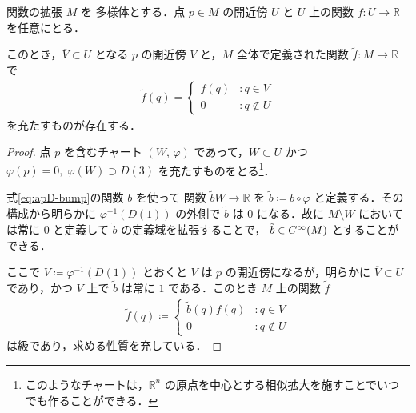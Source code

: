 \documentclass[geometry_main]{subfiles}
\begin{document}
\begin{mylem}[label=gen_cinfty]{\cinfty 関数の拡張}
	$M$ を \cinfty 多様体とする．点 $p \in M$ の開近傍 $U$ と $U$ 上の\cinfty 関数 $f \colon U \to \mathbb{R}$ を任意にとる．

	このとき，$\overline{V} \subset U$ となる $p$ の開近傍 $V$ と，$M$ 全体で定義された\cinfty 関数 $\tilde{f} \colon M \to \mathbb{R}$ で
	\begin{align}
		\tilde{f}(q) =
		\begin{cases}
			f(q) & \colon q \in V \\
			0 &\colon q \notin U
		\end{cases}
	\end{align}
	を充たすものが存在する．
\end{mylem}

\begin{proof}
    点 $p$ を含むチャート $(W,\, \varphi)$ であって，$W \subset U$ かつ $\varphi(p) = 0,\; \varphi(W) \supset D(3)$ を充たすものをとる\footnote{このようなチャートは，$\mathbb{R}^n$ の原点を中心とする相似拡大を施すことでいつでも作ることができる．}．

    式\eqref{eq:apD-bump}の関数 $b$ を使って \cinfty 関数 $\tilde{b} W \to \mathbb{R}$ を $\tilde{b} \coloneqq b \circ \varphi$ と定義する．その構成から明らかに $\varphi^{-1}(D(1))$ の外側で $\tilde{b}$ は $0$ になる．故に $M\setminus W$ においては常に $0$ と定義して $\tilde{b}$ の定義域を拡張することで， $\tilde{b} \in C^\infty(M)$ とすることができる．
    
    ここで $V \coloneqq \varphi^{-1}(D(1))$ とおくと $V$ は $p$ の開近傍になるが，明らかに $\overline{V} \subset U$ であり，かつ $V$ 上で $\tilde{b}$ は常に $1$ である．このとき $M$ 上の関数 $\tilde{f}$
    \begin{align}
        \tilde{f}(q) \coloneqq
		\begin{cases}
			\tilde{b}(q) f(q) & \colon q \in V \\
			0 &\colon q \notin U
		\end{cases}
    \end{align}
    は\cinfty 級であり，求める性質を充している．
\end{proof}
\end{document}
